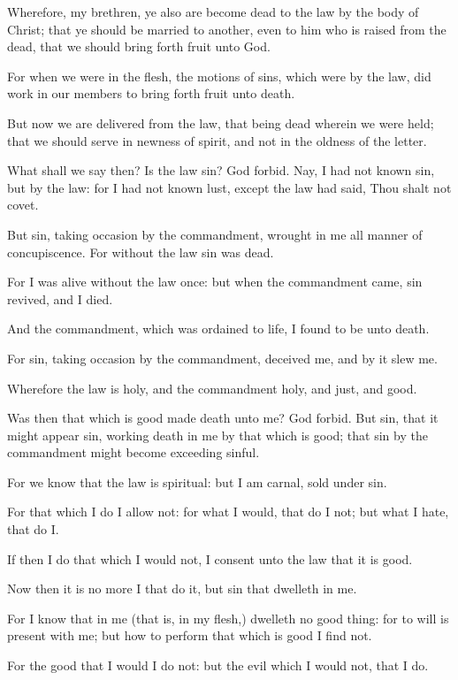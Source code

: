 \verse Wherefore, my brethren, ye also are become dead to the law by the body of Christ; that ye should be married to another, even to him who is raised from the dead, that we should bring forth fruit unto God.

\verse For when we were in the flesh, the motions of sins, which were by the law, did work in our members to bring forth fruit unto death.

\verse But now we are delivered from the law, that being dead wherein we were held; that we should serve in newness of spirit, and not in the oldness of the letter.

\verse What shall we say then? Is the law sin? God forbid. Nay, I had not known sin, but by the law: for I had not known lust, except the law had said, Thou shalt not covet.

\verse But sin, taking occasion by the commandment, wrought in me all manner of concupiscence. For without the law sin was dead.

\verse For I was alive without the law once: but when the commandment came, sin revived, and I died.

\verse And the commandment, which was ordained to life, I found to be unto death.

\verse For sin, taking occasion by the commandment, deceived me, and by it slew me.

\verse Wherefore the law is holy, and the commandment holy, and just, and good.

\verse Was then that which is good made death unto me? God forbid. But sin, that it might appear sin, working death in me by that which is good; that sin by the commandment might become exceeding sinful.

\verse For we know that the law is spiritual: but I am carnal, sold under sin.

\verse For that which I do I allow not: for what I would, that do I not; but what I hate, that do I.

\verse If then I do that which I would not, I consent unto the law that it is good.

\verse Now then it is no more I that do it, but sin that dwelleth in me.

\verse For I know that in me (that is, in my flesh,) dwelleth no good thing: for to will is present with me; but how to perform that which is good I find not.

\verse For the good that I would I do not: but the evil which I would not, that I do.

